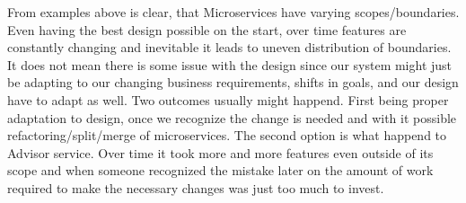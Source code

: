 From examples above is clear, that Microservices have varying scopes/boundaries. Even having the best design possible on the start, over time features are constantly changing and inevitable it leads to uneven distribution of boundaries. It does not mean there is some issue with the design since our system might just be adapting to our changing business requirements, shifts in goals, and our design have to adapt as well. Two outcomes usually might happend. First being proper adaptation to design, once we recognize the change is needed and with it possible refactoring/split/merge of microservices. The second option is what happend to Advisor service. Over time it took more and more features even outside of its scope and when someone recognized the mistake later on the amount of work required to make the necessary changes was just too much to invest.
